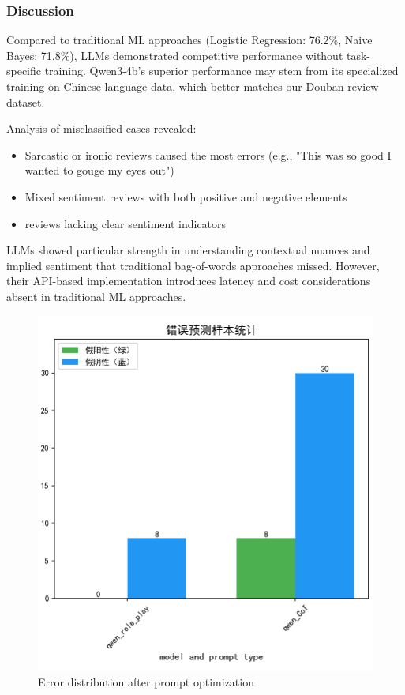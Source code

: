 \documentclass{article}
\begin{document}
\subsubsection{Discussion}
\label{sssec:discussion}

Compared to traditional ML approaches (Logistic Regression: 76.2\%, Naive Bayes: 71.8\%), LLMs demonstrated competitive performance without task-specific training. Qwen3-4b's superior performance may stem from its specialized training on Chinese-language data, which better matches our Douban review dataset.

Analysis of misclassified cases revealed:
\begin{itemize}
    \item Sarcastic or ironic reviews caused the most errors (e.g., "This was so good I wanted to gouge my eyes out")
    \item Mixed sentiment reviews with both positive and negative elements
    \item reviews lacking clear sentiment indicators
\end{itemize}

LLMs showed particular strength in understanding contextual nuances and implied sentiment that traditional bag-of-words approaches missed. However, their API-based implementation introduces latency and cost considerations absent in traditional ML approaches.

\begin{figure}[h]
    \centering
    \includegraphics[width=1\columnwidth]{pic/T2P2B2.2.png}
    \caption{Error distribution after prompt optimization}
    \label{fig:error_analysis}
\end{figure}
\end{document}
